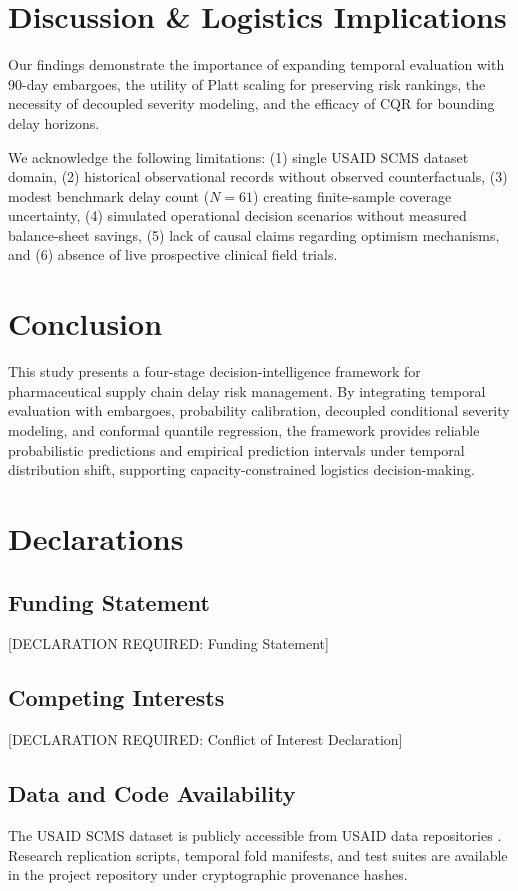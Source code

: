 \documentclass[11pt,a4paper]{article}
\begin{document}
\section{Discussion \& Logistics Implications}
Our findings demonstrate the importance of expanding temporal evaluation with 90-day embargoes, the utility of Platt scaling for preserving risk rankings, the necessity of decoupled severity modeling, and the efficacy of CQR for bounding delay horizons.

We acknowledge the following limitations: (1) single USAID SCMS dataset domain, (2) historical observational records without observed counterfactuals, (3) modest benchmark delay count ($N=61$) creating finite-sample coverage uncertainty, (4) simulated operational decision scenarios without measured balance-sheet savings, (5) lack of causal claims regarding optimism mechanisms, and (6) absence of live prospective clinical field trials.

\section{Conclusion}
This study presents a four-stage decision-intelligence framework for pharmaceutical supply chain delay risk management. By integrating temporal evaluation with embargoes, probability calibration, decoupled conditional severity modeling, and conformal quantile regression, the framework provides reliable probabilistic predictions and empirical prediction intervals under temporal distribution shift, supporting capacity-constrained logistics decision-making.

\section*{Declarations}
\subsection*{Funding Statement}
[DECLARATION REQUIRED: Funding Statement]

\subsection*{Competing Interests}
[DECLARATION REQUIRED: Conflict of Interest Declaration]

\subsection*{Data and Code Availability}
The USAID SCMS dataset is publicly accessible from USAID data repositories \cite{scmsdataset2016}. Research replication scripts, temporal fold manifests, and test suites are available in the project repository under cryptographic provenance hashes.



\end{document}

